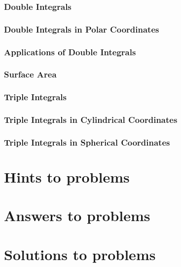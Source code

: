 \documentclass[12pt,letterpaper, openany]{book}
\begin{document}
\section{Double Integrals}

\section{Double Integrals in Polar Coordinates}

\section{Applications of Double Integrals}

\section{Surface Area}

\section{Triple Integrals}

\section{Triple Integrals in Cylindrical Coordinates}

\section{Triple Integrals in Spherical Coordinates}

%





\newpage
\part{Hints to problems}


\newpage
\part{Answers to problems}


\newpage
\part{Solutions to problems}

\end{document}

